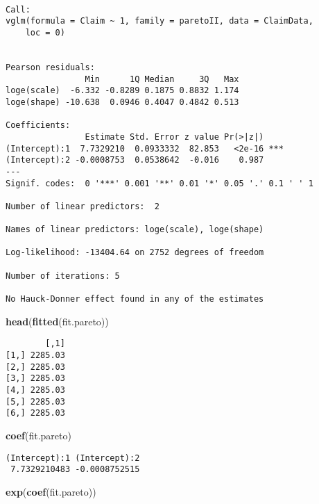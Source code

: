 \documentclass[]{book}
\newenvironment{Shaded}{\begin{snugshade}}{\end{snugshade}}
\newcommand{\KeywordTok}[1]{\textcolor[rgb]{0.13,0.29,0.53}{\textbf{#1}}}
\newcommand{\NormalTok}[1]{#1}
\theoremstyle{definition}
\theoremstyle{definition}
\theoremstyle{definition}
\theoremstyle{remark}
\begin{document}
\begin{verbatim}

Call:
vglm(formula = Claim ~ 1, family = paretoII, data = ClaimData, 
    loc = 0)


Pearson residuals:
                Min      1Q Median     3Q   Max
loge(scale)  -6.332 -0.8289 0.1875 0.8832 1.174
loge(shape) -10.638  0.0946 0.4047 0.4842 0.513

Coefficients: 
                Estimate Std. Error z value Pr(>|z|)    
(Intercept):1  7.7329210  0.0933332  82.853   <2e-16 ***
(Intercept):2 -0.0008753  0.0538642  -0.016    0.987    
---
Signif. codes:  0 '***' 0.001 '**' 0.01 '*' 0.05 '.' 0.1 ' ' 1

Number of linear predictors:  2 

Names of linear predictors: loge(scale), loge(shape)

Log-likelihood: -13404.64 on 2752 degrees of freedom

Number of iterations: 5 

No Hauck-Donner effect found in any of the estimates
\end{verbatim}

\begin{Shaded}
\begin{Highlighting}[]
\KeywordTok{head}\NormalTok{(}\KeywordTok{fitted}\NormalTok{(fit.pareto))}
\end{Highlighting}
\end{Shaded}

\begin{verbatim}
        [,1]
[1,] 2285.03
[2,] 2285.03
[3,] 2285.03
[4,] 2285.03
[5,] 2285.03
[6,] 2285.03
\end{verbatim}

\begin{Shaded}
\begin{Highlighting}[]
\KeywordTok{coef}\NormalTok{(fit.pareto)}
\end{Highlighting}
\end{Shaded}

\begin{verbatim}
(Intercept):1 (Intercept):2 
 7.7329210483 -0.0008752515 
\end{verbatim}

\begin{Shaded}
\begin{Highlighting}[]
\KeywordTok{exp}\NormalTok{(}\KeywordTok{coef}\NormalTok{(fit.pareto))}
\end{Highlighting}
\end{Shaded}
\end{document}

